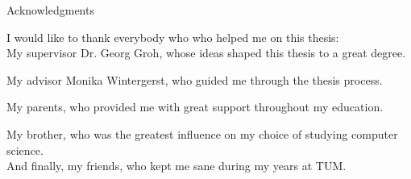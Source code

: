 \thispagestyle{empty}

\vspace*{20mm}

\begin{center}
{ Acknowledgments}
\end{center}

\vspace{10mm} 
I would like to thank everybody who who helped me on this thesis:\\

My supervisor Dr. Georg Groh, whose ideas shaped this thesis to a great degree.

My advisor Monika Wintergerst, who guided me through the thesis process.

My parents, who provided me with great support throughout my education.

My brother, who was the greatest influence on my choice of studying computer science.\\

And finally, my friends, who kept me sane during my years at TUM.
\cleardoublepage{}
